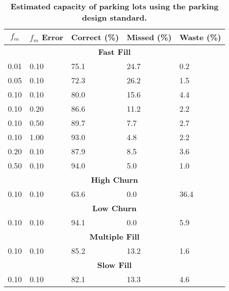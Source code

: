 \begin{table}[t]
\begin{threeparttable}
{\small
\begin{tabularx}{\columnwidth}{XXXXX}
\multicolumn{1}{c}{\normalsize{\textbf{$f_m$}}} & 
\multicolumn{1}{c}{\normalsize{\textbf{$f_m$ Error}}} & 
\multicolumn{1}{c}{\normalsize{\textbf{Correct (\%)}}} & 
\multicolumn{1}{c}{\normalsize{\textbf{Missed (\%)}}} & 
\multicolumn{1}{c}{\normalsize{\textbf{Waste (\%)}}}\\ \toprule

\multicolumn{5}{c}{\normalsize{\textbf{Fast Fill}}} \\
\midrule
0.01 & 0.10 & 75.1 & 24.7 & 0.2 \\
0.05 & 0.10 & 72.3 & 26.2 & 1.5 \\
0.10 & 0.10 & 80.0 & 15.6 & 4.4 \\
0.10 & 0.20 & 86.6 & 11.2 & 2.2 \\
0.10 & 0.50 & 89.7 & 7.7 & 2.7 \\
0.10 & 1.00 & 93.0 & 4.8 & 2.2 \\
0.20 & 0.10 & 87.9 & 8.5 & 3.6 \\
0.50 & 0.10 & 94.0 & 5.0 & 1.0 \\
\multicolumn{5}{c}{\normalsize{\textbf{High Churn}}} \\
\midrule
0.10 & 0.10 & 63.6 & 0.0 & 36.4 \\
\multicolumn{5}{c}{\normalsize{\textbf{Low Churn}}} \\
\midrule
0.10 & 0.10 & 94.1 & 0.0 & 5.9 \\
\multicolumn{5}{c}{\normalsize{\textbf{Multiple Fill}}} \\
\midrule
0.10 & 0.10 & 85.2 & 13.2 & 1.6 \\
\multicolumn{5}{c}{\normalsize{\textbf{Slow Fill}}} \\
\midrule
0.10 & 0.10 & 82.1 & 13.3 & 4.6 \\
\end{tabularx}
}
\caption{\textbf{Estimated capacity of parking lots using the parking design standard.}}
\label{table-capacity}
\end{threeparttable}
\end{table}
